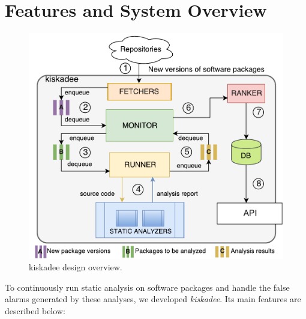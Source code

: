 \section{Features and System Overview}
\label{sec:system_overview}

\begin{figure}[hbt]
\centering
\includegraphics[width=.75\textwidth]{figures/kiskadee-overview.pdf}
  \caption{kiskadee design overview.}\label{fig:kiskadee:overview}
\end{figure}

To continuously run static analysis on software packages and handle the false
alarms generated by these analyses, we developed \textit{kiskadee}. Its main features are described below:

